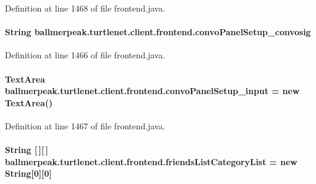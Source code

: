 Definition at line 1468 of file frontend.\-java.

\hypertarget{classballmerpeak_1_1turtlenet_1_1client_1_1frontend_a0fec8e94df0b2bcc31292da80030c92f}{
\paragraph[{convo\-Panel\-Setup\-\_\-convosig}]{\setlength{\rightskip}{0pt plus 5cm}String ballmerpeak.\-turtlenet.\-client.\-frontend.\-convo\-Panel\-Setup\-\_\-convosig\hspace{0.3cm}{\ttfamily [private]}}}\label{classballmerpeak_1_1turtlenet_1_1client_1_1frontend_a0fec8e94df0b2bcc31292da80030c92f}


Definition at line 1466 of file frontend.\-java.

\hypertarget{classballmerpeak_1_1turtlenet_1_1client_1_1frontend_a5f2d5e5cab0462b9bd2b2c05d412606d}{
\paragraph[{convo\-Panel\-Setup\-\_\-input}]{\setlength{\rightskip}{0pt plus 5cm}Text\-Area ballmerpeak.\-turtlenet.\-client.\-frontend.\-convo\-Panel\-Setup\-\_\-input = new Text\-Area()\hspace{0.3cm}{\ttfamily [private]}}}\label{classballmerpeak_1_1turtlenet_1_1client_1_1frontend_a5f2d5e5cab0462b9bd2b2c05d412606d}


Definition at line 1467 of file frontend.\-java.

\hypertarget{classballmerpeak_1_1turtlenet_1_1client_1_1frontend_af616e8f4d9c96bac48b8f997004cc385}{
\paragraph[{friends\-List\-Category\-List}]{\setlength{\rightskip}{0pt plus 5cm}String \mbox{[}$\,$\mbox{]}\mbox{[}$\,$\mbox{]} ballmerpeak.\-turtlenet.\-client.\-frontend.\-friends\-List\-Category\-List = new String\mbox{[}0\mbox{]}\mbox{[}0\mbox{]}\hspace{0.3cm}{\ttfamily [package]}}}\label{classballmerpeak_1_1turtlenet_1_1client_1_1frontend_af616e8f4d9c96bac48b8f997004cc385}


